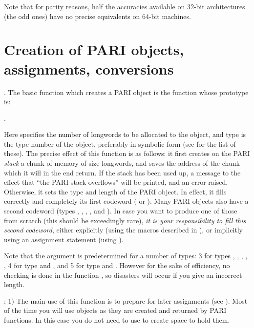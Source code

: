 Note that for parity reasons, half the accuracies available on 32-bit
architectures (the odd ones) have no precise equivalents on 64-bit machines.

\section{Creation of PARI objects, assignments, conversions}

.
The basic function which creates a PARI object is the function
 whose prototype is:

.

\noindent
Here  specifies the number of longwords to be allocated to the
object, and type is the type number of the object, preferably in symbolic
form (see  for the list of these). The precise effect of
this function is as follows: it first creates on the PARI \emph{stack} a
chunk of memory of size  longwords, and saves the address of the
chunk which it will in the end return.  If the stack has been used up, a
message to the effect that ``the PARI stack overflows'' will be printed,
and an error raised. Otherwise, it sets the type and length of the PARI object.
In effect, it fills correctly and completely its first codeword ( or
).  Many PARI objects also have a second codeword (types ,
,  , , and ). In case you want to
produce one of those from scratch (this should be exceedingly rare), \emph{it
is your responsibility to fill this second codeword}, either explicitly (using
the macros described in ), or implicitly using an assignment
statement (using ).

Note that the argument  is predetermined for a number of types:
3 for types , , , ,
, 4 for type  and , and 5 for type 
and . However for the sake of efficiency, no checking is done in the
function , so disasters will occur if you give an incorrect
length.

: 1)  The main use of this function is to prepare for later
assignments (see ). Most of the time you will use 
objects as they are created and returned by PARI functions. In this case you
do not need to use  to create space to hold them.

